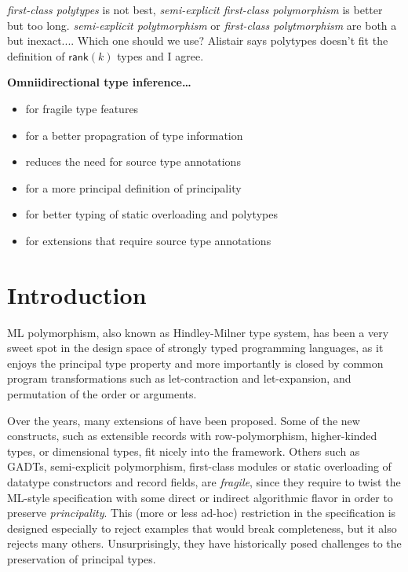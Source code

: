 \documentclass[acmsmall,screen,nonacm]{acmart}
\begin{document}
\Xdidier
  {\emph{first-class polytypes} is not best,
   \emph{semi-explicit first-class polymorphism} is better but too long.
   \emph{semi-explicit polytmorphism} or 
   \emph{first-class polytmorphism} are both a but inexact....
   Which one should we use?
   Alistair says polytypes doesn't fit the definition of $\mathsf{rank}(k)$
  types and I agree.} 


\begin{version}[Titles]{\True}
\textbf{Omniidirectional type inference\ldots}
\begin{itemize}
\item for fragile \ML type features 
\item for a better propagration of type information 
\item reduces the need for source type annotations 
\item for a more principal definition of principality
\item for better typing of static overloading and polytypes
\item for \ML extensions that require source type annotations
\end{itemize}

\end{version}

\section{Introduction}

ML polymorphism, also known as Hindley-Milner type system, has been a very
sweet spot in the design space of strongly typed programming languages, as
it enjoys the principal type property and more importantly is closed by
common program transformations such as let-contraction and let-expansion,
and permutation of the order or arguments.

Over the years, many extensions of \ML have been proposed. Some of the
new constructs, such as extensible records with row-polymorphism,
higher-kinded types, or dimensional types, fit nicely into the \ML
framework. Others such as GADTs, semi-explicit polymorphism,
first-class modules or static overloading of datatype constructors and
record fields, are \emph{fragile}, since they require to twist the
ML-style specification with some direct or indirect algorithmic flavor
in order to preserve \emph{principality}. This (more or less ad-hoc)
restriction in the specification is designed especially to reject
examples that would break completeness, but it also rejects many
others.
Unsurprisingly, they have historically posed challenges to the
preservation of principal types.
\end{document}
